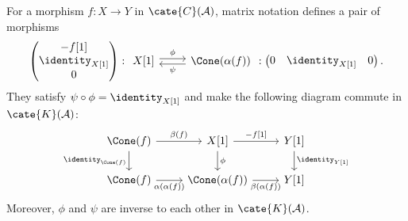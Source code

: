 \begin{lemma}\label{prop:cone-alpha}
	For a morphism $f:X\to Y$ in $\cate{C}(\mathcal{A})$, matrix notation
	defines a pair of morphisms
	\[ \begin{pmatrix} -f[1] \\ \identity_{X[1]} \\ 0 \end{pmatrix} : \begin{tikzcd} X[1] \arrow[r, shift left, "\phi"] & \Cone(\alpha(f)) \arrow[l, shift left, "\psi"] \end{tikzcd} : \begin{pmatrix} 0 & \identity_{X[1]} & 0 \end{pmatrix}. \]
	They satisfy $\psi\circ\phi=\identity_{X[1]}$ and make the following
	diagram commute in $\cate{K}(\mathcal{A})$:
	\[\begin{tikzcd}
		\Cone(f) \arrow[d, "{\identity_{\Cone(f)}}"'] \arrow[r, "\beta(f)"] & X[1] \arrow[d, "\phi"] \arrow[r, "{-f[1]}"] & Y[1] \arrow[d, "{\identity_{Y[1]}}"] \\
		\Cone(f) \arrow[r, "{\alpha(\alpha(f))}"'] & \Cone(\alpha(f)) \arrow[r, "\beta(\alpha(f))"'] & Y[1]
	\end{tikzcd}\]
	Moreover, $\phi$ and $\psi$ are inverse to each other in
	$\cate{K}(\mathcal{A})$.
\end{lemma}
